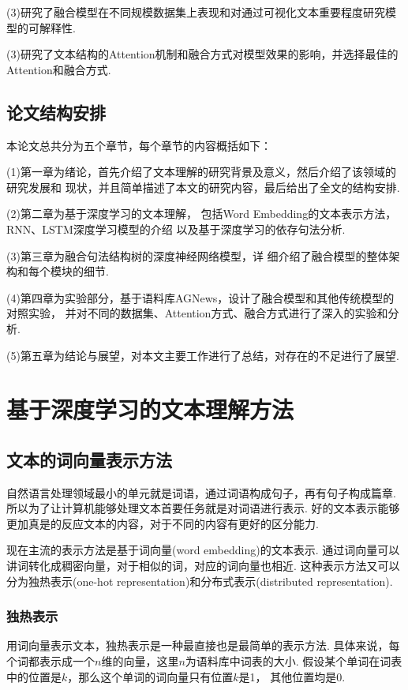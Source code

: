 \documentclass[bachelor,adobefonts]{jnuthesis}
\begin{document}
(3)研究了融合模型在不同规模数据集上表现和对通过可视化文本重要程度研究模型的可解释性.

(3)研究了文本结构的Attention机制和融合方式对模型效果的影响，并选择最佳的Attention和融合方式.

\section{论文结构安排}
本论文总共分为五个章节，每个章节的内容概括如下：

(1)第一章为绪论，首先介绍了文本理解的研究背景及意义，然后介绍了该领域的研究发展和 现状，并且简单描述了本文的研究内容，最后给出了全文的结构安排.

(2)第二章为基于深度学习的文本理解，
包括Word Embedding的文本表示方法，RNN、LSTM深度学习模型的介绍
以及基于深度学习的依存句法分析.

(3)第三章为融合句法结构树的深度神经网络模型，详
细介绍了融合模型的整体架构和每个模块的细节.

(4)第四章为实验部分，基于语料库AGNews，设计了融合模型和其他传统模型的对照实验，
并对不同的数据集、Attention方式、融合方式进行了深入的实验和分析.

(5)第五章为结论与展望，对本文主要工作进行了总结，对存在的不足进行了展望.


\chapter{基于深度学习的文本理解方法}
\section{文本的词向量表示方法}
自然语言处理领域最小的单元就是词语，通过词语构成句子，再有句子构成篇章.
所以为了让计算机能够处理文本首要任务就是对词语进行表示.
好的文本表示能够更加真是的反应文本的内容，对于不同的内容有更好的区分能力.

现在主流的表示方法是基于词向量(word embedding)的文本表示.
通过词向量可以讲词转化成稠密向量，对于相似的词，对应的词向量也相近.
这种表示方法又可以分为独热表示(one-hot representation)和分布式表示(distributed representation).

\subsection{独热表示}
用词向量表示文本，独热表示是一种最直接也是最简单的表示方法.
具体来说，每个词都表示成一个$n$维的向量，这里$n$为语料库中词表的大小.
假设某个单词在词表中的位置是$k$，那么这个单词的词向量只有位置$k$是1，
其他位置均是0.
\end{document}
